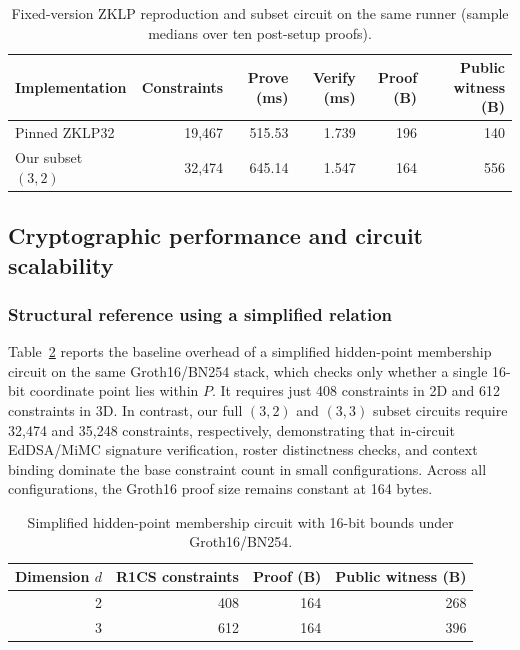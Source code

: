 \begin{table}[htbp]\centering\footnotesize
\caption{Fixed-version ZKLP reproduction and subset circuit on the same runner (sample medians over ten post-setup proofs).}\label{tab:zklp-repro}
\setlength{\tabcolsep}{3pt}
\begin{tabularx}{\linewidth}{@{}Xrrrrr@{}}\toprule
Implementation&Constraints&Prove (ms)&Verify (ms)&Proof (B)&Public witness (B)\\\midrule
Pinned ZKLP32&19,467&515.53&1.739&196&140\\
Our subset $(3,2)$&32,474&645.14&1.547&164&556\\\bottomrule
\end{tabularx}
\end{table}

\subsection{Cryptographic performance and circuit scalability}\label{sec:crypto-perf}
\subsubsection{Structural reference using a simplified relation}
Table~\ref{tab:point-zk} reports the baseline overhead of a simplified hidden-point membership circuit on the same Groth16/BN254 stack, which checks only whether a single 16-bit coordinate point lies within $P$. It requires just 408 constraints in 2D and 612 constraints in 3D. In contrast, our full $(3, 2)$ and $(3, 3)$ subset circuits require 32,474 and 35,248 constraints, respectively, demonstrating that in-circuit EdDSA/MiMC signature verification, roster distinctness checks, and context binding dominate the base constraint count in small configurations. Across all configurations, the Groth16 proof size remains constant at 164 bytes.

\begin{table}[htbp]\centering\small
\caption{Simplified hidden-point membership circuit with 16-bit bounds under Groth16/BN254.}\label{tab:point-zk}
\begin{tabular}{rrrr}\toprule
Dimension $d$&R1CS constraints&Proof (B)&Public witness (B)\\\midrule
2&408&164&268\\
3&612&164&396\\\bottomrule
\end{tabular}
\end{table}

